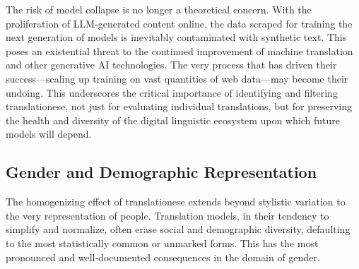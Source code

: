 \documentclass[11pt,a4paper]{article}
\begin{document}
The risk of model collapse is no longer a theoretical concern. With the proliferation of LLM-generated content online, the data scraped for training the next generation of models is inevitably contaminated with synthetic text. This poses an existential threat to the continued improvement of machine translation and other generative AI technologies. The very process that has driven their success---scaling up training on vast quantities of web data---may become their undoing. This underscores the critical importance of identifying and filtering translationese, not just for evaluating individual translations, but for preserving the health and diversity of the digital linguistic ecosystem upon which future models will depend.

\subsection{Gender and Demographic Representation}

The homogenizing effect of translationese extends beyond stylistic variation to the very representation of people. Translation models, in their tendency to simplify and normalize, often erase social and demographic diversity, defaulting to the most statistically common or unmarked forms. This has the most pronounced and well-documented consequences in the domain of gender.
\end{document}
